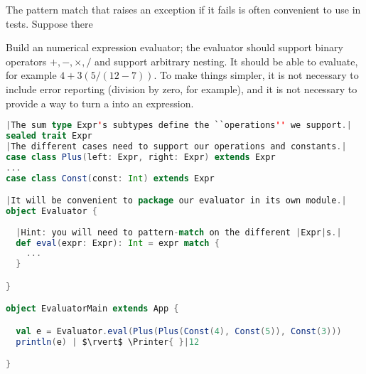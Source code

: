 \documentclass[10 pt]{article}
\begin{document}
The pattern match that raises an exception if it fails is often convenient to use in tests. Suppose there 

\begin{example}
Build an numerical expression evaluator; the evaluator should support binary operators $+, -, \times, /$ and support arbitrary nesting. It should be able to evaluate, for example $4+3(5/(12-7))$. To make things simpler, it is not necessary to include error reporting (division by zero, for example), and it is not necessary to provide a way to turn a  into an expression.

\begin{lstlisting}[caption={Expression evaluator}, label={code:ee}, language=Scala, escapechar=|]
|The sum type Expr's subtypes define the ``operations'' we support.|
sealed trait Expr
|The different cases need to support our operations and constants.|
case class Plus(left: Expr, right: Expr) extends Expr
...
case class Const(const: Int) extends Expr

|It will be convenient to package our evaluator in its own module.|
object Evaluator {
  
  |Hint: you will need to pattern-match on the different |Expr|s.|
  def eval(expr: Expr): Int = expr match {
    ...
  }

}

object EvaluatorMain extends App {

  val e = Evaluator.eval(Plus(Plus(Const(4), Const(5)), Const(3)))
  println(e) | $\rvert$ \Printer{ }|12

}
\end{lstlisting}
\end{example}
\end{document}
